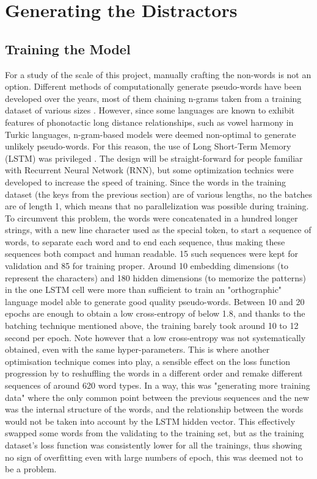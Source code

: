 \section{Generating the Distractors}
    \subsection{Training the Model}
For a study of the scale of this project, manually crafting the non-words is not an option. Different methods of computationally generate pseudo-words have been developed over the years, most of them chaining n-grams taken from a training dataset of various sizes \parencite{new_unipseudo_2023, keuleers_wuggy_2010}. However, since some languages are known to exhibit features of phonotactic long distance relationships, such as vowel harmony in Turkic languages, n-gram-based models were deemed non-optimal to generate unlikely pseudo-words. For this reason, the use of Long Short-Term Memory (LSTM) was privileged \parencite{hochreiter_long_1997}. The design will be straight-forward for people familiar with Recurrent Neural Network (RNN), but some optimization technics were developed to increase the speed of training. Since the words in the training dataset (the keys from the previous section) are of various lengths, no the batches are of length 1, which means that no parallelization was possible during training. To circumvent this problem, the words were concatenated in a hundred longer strings, with a new line character used as the special token, to start a sequence of words, to separate each word and to end each sequence, thus making these sequences both compact and human readable. 15 such sequences were kept for validation and 85 for training proper. Around 10 embedding dimensions (to represent the characters) and 180 hidden dimensions (to memorize the patterns) in the one LSTM cell were more than sufficient to train an "orthographic" language model able to generate good quality pseudo-words. Between 10 and 20 epochs are enough to obtain a low cross-entropy of below 1.8, and thanks to the batching technique mentioned above, the training barely took around 10 to 12 second per epoch. Note however that a low cross-entropy was not systematically obtained, even with the same hyper-parameters. This is where another optimisation technique comes into play, a sensible effect on the loss function progression by to reshuffling the words in a different order and remake different sequences of around 620 word types. In a way, this was "generating more training data" where the only common point between the previous sequences and the new was the internal structure of the words, and the relationship between the words would not be taken into account by the LSTM hidden vector. This effectively swapped some words from the validating to the training set, but as the training dataset's loss function was consistently lower for all the trainings, thus showing no sign of overfitting even with large numbers of epoch, this was deemed not to be a problem.

